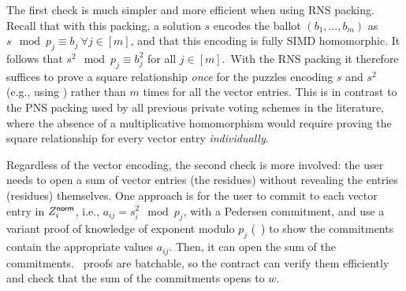 The first check is much simpler and more efficient when using RNS packing. Recall that with this packing, a solution $s$ encodes the ballot $(b_1, \dots, b_m)$ as $s \mod{p_j} \equiv b_j\ \forall j \in [m]$, and that this encoding is fully SIMD homomorphic. It follows that $s^2 \mod{p_j} \equiv b_j^2$ for all $j \in [m]$.\footnotemark\ With the RNS packing it therefore suffices to prove a square relationship \emph{once} for the puzzles encoding $s$ and $s^2$ (e.g., using \zkposqs) rather than $m$ times for all the vector entries. This is in contrast to the PNS packing used by all previous private voting schemes in the literature, where the absence of a multiplicative homomorphism would require proving the square relationship for every vector entry \emph{individually}.

Regardless of the vector encoding, the second check is more involved: the user needs to open a sum of vector entries (the residues) without revealing the entries (residues) themselves. One approach is for the user to commit to each vector entry in $Z_i^{\sf norm}$, i.e., $a_{ij} = s_i^2 \mod p_j$, with a Pedersen commitment, and use a variant proof of knowledge of exponent modulo $p_j$ (\pokemon~\cite{C:BonBunFis19}) to show the commitments contain the appropriate values $a_{ij}$. Then, it can open the sum of the commitments. \pokemon\ proofs are batchable, so the contract can verify them efficiently and check that the sum of the commitments opens to $w$.


